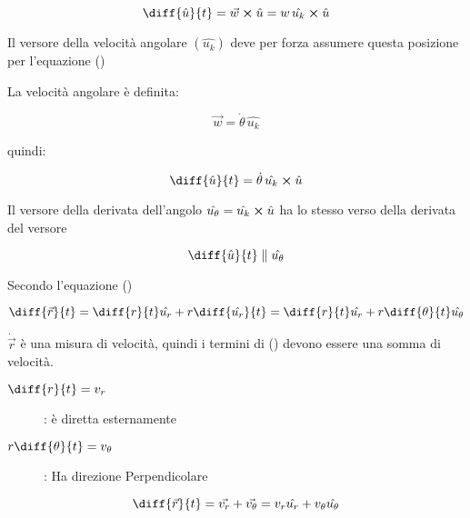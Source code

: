 \begin{equation}
  \diff{\hat{u}}{t} = \vec{w} \crossproduct \hat{u} = w \, \hat{u_k} \crossproduct \hat{u}
\end{equation}

Il versore della velocità angolare $(\hat{u_k})$ deve per forza assumere questa posizione per l'equazione ()

La velocità angolare è definita:

\begin{equation}
  \vec{w} = \dot{\theta} \, \hat{u_k}
\end{equation}

quindi:

\begin{equation}
  \diff{\hat{u}}{t} = \dot{\theta} \, \hat{u_k} \crossproduct \hat{u}
\end{equation}

Il versore della derivata dell'angolo $ \hat{u_{\theta}} =\hat{u_k} \crossproduct \hat{u} $
ha lo stesso verso della derivata del versore

\begin{equation}
  \diff{\hat{u}}{t} \parallel \hat{u_{\theta}}
\end{equation}

Secondo l'equazione ()

\begin{equation}
  \diff{\vec{r}}{t} = \diff{r}{t}\hat{u_r} + r \diff{\hat{u_r}}{t} = \diff{r}{t}\hat{u_r} + r \diff{\theta}{t}\hat{u_{\theta}}
\end{equation}

$\dot{\vec{r}}$ è una misura di velocità, quindi i termini di () devono essere una somma di velocità.


\begin{description}
  \item [$\diff{r}{t} = v_r$]: è diretta esternamente
  \item [$r \diff{\theta}{t} = v_{\theta}$]: Ha direzione Perpendicolare
\end{description}

\begin{equation}
  \diff{\vec{r}}{t} = \vec{v_r} + \vec{v_{\theta}} = v_r \hat{u_r} + v_{\theta} \hat{u_{\theta}}
\end{equation}
